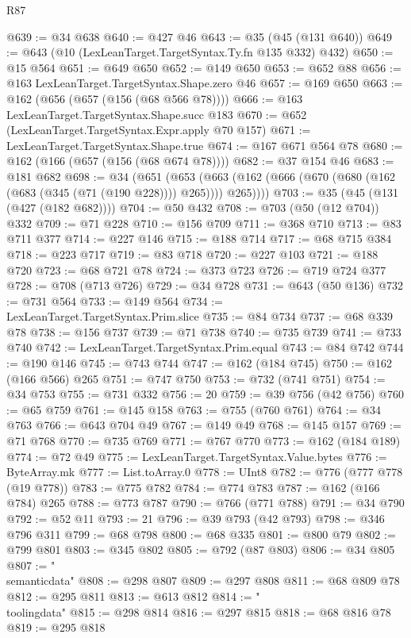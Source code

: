 \begin{lexlean}{R87}
\begin{coremodule}
{{@639 := @34 @638
@640 := @427 @46
@643 := @35 (@45 (@131 @640))
@649 := @643 (@10 (LexLeanTarget.TargetSyntax.Ty.fn @135 @332) @432)
@650 := @15 @564
@651 := @649 @650
@652 := @149 @650
@653 := @652 @88
@656 := @163 LexLeanTarget.TargetSyntax.Shape.zero @46
@657 := @169 @650
@663 := @162 (@656 (@657 (@156 (@68 @566 @78))))
@666 := @163 LexLeanTarget.TargetSyntax.Shape.succ @183
@670 := @652 (LexLeanTarget.TargetSyntax.Expr.apply @70 @157)
@671 := LexLeanTarget.TargetSyntax.Shape.true
@674 := @167 @671 @564 @78
@680 := @162 (@166 (@657 (@156 (@68 @674 @78))))
@682 := @37 @154 @46
@683 := @181 @682
@698 := @34
    (@651
      (@653 (@663 (@162 (@666 (@670 (@680 (@162 (@683 (@345 (@71 (@190 @228)))) @265)))) @265))))
@703 := @35 (@45 (@131 (@427 (@182 @682))))
@704 := @50 @432
@708 := @703 (@50 (@12 @704)) @332
@709 := @71 @228
@710 := @156 @709
@711 := @368 @710
@713 := @83 @711 @377
@714 := @227 @146
@715 := @188 @714
@717 := @68 @715 @384
@718 := @223 @717
@719 := @83 @718
@720 := @227 @103
@721 := @188 @720
@723 := @68 @721 @78
@724 := @373 @723
@726 := @719 @724 @377
@728 := @708 (@713 @726)
@729 := @34 @728
@731 := @643 (@50 @136)
@732 := @731 @564
@733 := @149 @564
@734 := LexLeanTarget.TargetSyntax.Prim.slice
@735 := @84 @734
@737 := @68 @339 @78
@738 := @156 @737
@739 := @71 @738
@740 := @735 @739
@741 := @733 @740
@742 := LexLeanTarget.TargetSyntax.Prim.equal
@743 := @84 @742
@744 := @190 @146
@745 := @743 @744
@747 := @162 (@184 @745)
@750 := @162 (@166 @566) @265
@751 := @747 @750
@753 := @732 (@741 @751)
@754 := @34 @753
@755 := @731 @332
@756 := 20
@759 := @39 @756 (@42 @756)
@760 := @65 @759
@761 := @145 @158
@763 := @755 (@760 @761)
@764 := @34 @763
@766 := @643 @704 @49
@767 := @149 @49
@768 := @145 @157
@769 := @71 @768
@770 := @735 @769
@771 := @767 @770
@773 := @162 (@184 @189)
@774 := @72 @49
@775 := LexLeanTarget.TargetSyntax.Value.bytes
@776 := ByteArray.mk
@777 := List.toArray.{0}
@778 := UInt8
@782 := @776 (@777 @778 (@19 @778))
@783 := @775 @782
@784 := @774 @783
@787 := @162 (@166 @784) @265
@788 := @773 @787
@790 := @766 (@771 @788)
@791 := @34 @790
@792 := @52 @11
@793 := 21
@796 := @39 @793 (@42 @793)
@798 := @346 @796 @311
@799 := @68 @798
@800 := @68 @335
@801 := @800 @79
@802 := @799 @801
@803 := @345 @802
@805 := @792 (@87 @803)
@806 := @34 @805
@807 := "\\semanticdata"
@808 := @298 @807
@809 := @297 @808
@811 := @68 @809 @78
@812 := @295 @811
@813 := @613 @812
@814 := "\\toolingdata"
@815 := @298 @814
@816 := @297 @815
@818 := @68 @816 @78
@819 := @295 @818
}}
\end{coremodule}
\end{lexlean}
